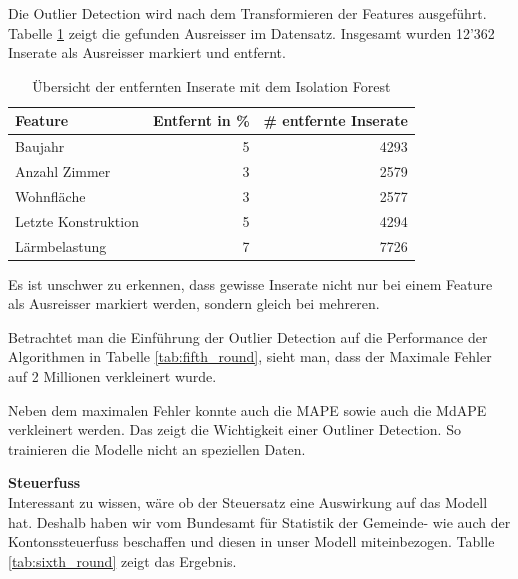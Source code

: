 Die Outlier Detection wird nach dem Transformieren der Features ausgeführt. Tabelle \ref{tab:iso_forest} zeigt die gefunden Ausreisser im Datensatz. Insgesamt wurden 12'362 Inserate als Ausreisser markiert und entfernt.

\begin{table}[ht]
\centering
{}
\begin{tabular}{@{}lrr@{}}
\toprule
Feature & Entfernt in \% & \# entfernte Inserate\\
\midrule
Baujahr & 5 & 4293\\
Anzahl Zimmer & 3 & 2579\\
Wohnfläche & 3 & 2577\\
Letzte Konstruktion & 5 & 4294\\
Lärmbelastung & 7 & 7726\\
\bottomrule
\end{tabular}
\caption{Übersicht der entfernten Inserate mit dem Isolation Forest}
\label{tab:iso_forest}
\end{table}

Es ist unschwer zu erkennen, dass gewisse Inserate nicht nur bei einem Feature als Ausreisser markiert werden, sondern gleich bei mehreren.

Betrachtet man die Einführung der Outlier Detection auf die Performance der Algorithmen in Tabelle \ref{tab:fifth_round}, sieht man, dass der Maximale Fehler auf 2 Millionen verkleinert wurde.

\begin{table}[ht]
\centering
{}
\caption{Ergebnisse mit Einbezug einer Outlier Detection}
\label{tab:fifth_round}
\end{table}

Neben dem maximalen Fehler konnte auch die MAPE sowie auch die MdAPE verkleinert werden. Das zeigt die Wichtigkeit einer Outliner Detection. So trainieren die Modelle nicht an speziellen Daten.

\textbf{Steuerfuss}\\
Interessant zu wissen, wäre ob der Steuersatz eine Auswirkung auf das Modell hat. Deshalb haben wir vom Bundesamt für Statistik der Gemeinde- wie auch der Kontonssteuerfuss beschaffen und diesen in unser Modell miteinbezogen. Tablle \ref{tab:sixth_round} zeigt das Ergebnis.

